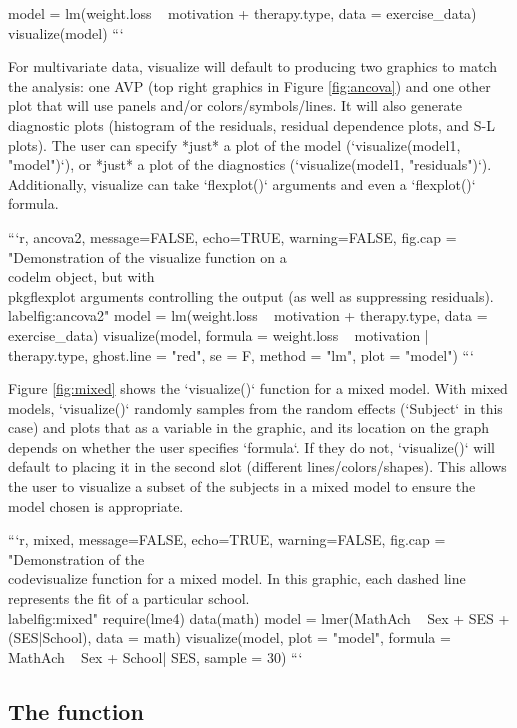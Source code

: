 {{{{{{{{{{{{{model = lm(weight.loss ~ motivation + therapy.type, 
           data = exercise_data)
visualize(model)
```

For multivariate data, visualize will default to producing two graphics to match the analysis: one AVP (top right graphics in Figure \ref{fig:ancova}) and one other plot that will use panels and/or colors/symbols/lines. It will also generate diagnostic plots (histogram of the residuals, residual dependence plots, and S-L plots). The user can specify *just* a plot of the model (`visualize(model1, "model")`), or *just* a plot of the diagnostics (`visualize(model1, "residuals")`). Additionally, visualize can take `flexplot()` arguments and even a `flexplot()` formula.

```{r, ancova2, message=FALSE, echo=TRUE, warning=FALSE, fig.cap = "Demonstration of the visualize function on a \\code{lm} object, but with \\pkg{flexplot} arguments controlling the output (as well as suppressing residuals).  \\label{fig:ancova2}"}
model = lm(weight.loss ~ motivation + therapy.type, data = exercise_data)
visualize(model, formula = weight.loss ~ motivation | therapy.type, 
          ghost.line = "red", se = F, method = "lm", plot = "model")
```

Figure \ref{fig:mixed} shows the `visualize()` function for a mixed model. With mixed models, `visualize()` randomly samples from the random effects (`Subject` in this case) and plots that as a variable in the graphic, and its location on the graph depends on whether the user specifies `formula`. If they do not, `visualize()` will default to placing it in the second slot (different lines/colors/shapes). This allows the user to visualize a subset of the subjects in a mixed model to ensure the model chosen is appropriate. 

```{r, mixed, message=FALSE, echo=TRUE, warning=FALSE, fig.cap = "Demonstration of the \\code{visualize} function for a mixed model. In this graphic, each dashed line represents the fit of a particular school. \\label{fig:mixed}"}
require(lme4)
data(math)
model = lmer(MathAch ~ Sex + SES + (SES|School), data = math)
visualize(model, 
  plot = "model",
  formula = MathAch ~  Sex + School| SES, 
  sample = 30)
```

\subsection[The compare.fits() function]{The  function} \label{sec:compare.fits}

}}}}}}}}}}}}}
